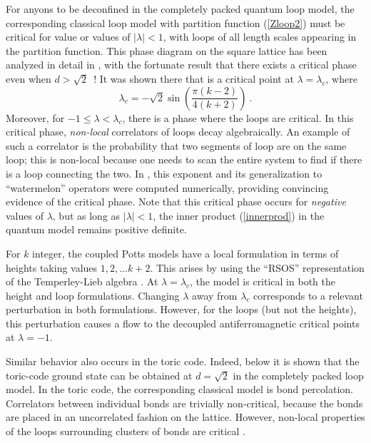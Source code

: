 \documentclass[11pt]{article}
\begin{document}
For anyons to be deconfined in the completely packed quantum loop
model, the corresponding classical loop model with partition function
(\ref{Zloop2}) must be critical for value or values of $|\lambda|<1$,
with loops of all length scales appearing in the partition
function. This phase diagram on the square lattice has been
analyzed in detail in \cite{FJ}, with the fortunate result that there
exists a critical phase even when $d>\sqrt{2}$\ ! 
It was shown
there that is a critical point at $\lambda=\lambda_c$, where
\begin{equation}
\lambda_c = -\sqrt{2}\sin\left(\frac{\pi(k-2)}{4(k+2)}\right)\ .
\label{lamc}
\end{equation}
Moreover, for $-1\le \lambda < \lambda_c$, there is a phase where the
loops are critical. In this critical phase, {\em non-local}
correlators of loops decay algebraically. An example of such a
correlator is the probability that two segments of loop are on the
same loop; this is non-local because one needs to scan the entire
system to find if there is a loop connecting the two. In \cite{FJ},
this exponent and its generalization to ``watermelon'' operators were
computed numerically, providing convincing evidence of the critical
phase. Note that this critical phase occurs for {\em negative} values
of $\lambda$, but as long as $|\lambda|<1$, the inner product
(\ref{innerprod}) in the quantum model remains positive definite. 



For $k$ integer, the coupled Potts models have a local formulation in
terms of heights taking values $1,2,\dots k+2$. This arises by using
the ``RSOS'' representation of the Temperley-Lieb algebra \cite{Pasquier}. At
$\lambda=\lambda_c$, the model is critical in both the height and loop
formulations. Changing $\lambda$ away from $\lambda_c$ corresponds to
a relevant perturbation in both formulations. However, for the loops
(but not the heights), this perturbation causes a flow to the
decoupled antiferromagnetic critical points at $\lambda=-1$. 

Similar behavior also occurs in the
toric code. Indeed, below it is shown that the toric-code ground state
can be obtained at $d=\sqrt{2}$ in the completely packed loop model.
In the toric code, the corresponding classical model is bond
percolation. Correlators between individual bonds are trivially
non-critical, because the bonds are placed in an uncorrelated fashion
on the lattice. However, non-local properties of the loops
surrounding clusters of bonds are critical \cite{Nienhuis}. 
\end{document}
